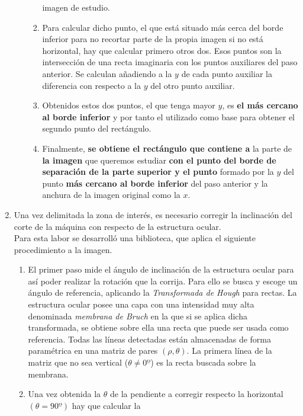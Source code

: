 \begin{enumerate}
\begin{enumerate}[label*=\arabic*.]
\begin{enumerate}[label*=\arabic*.]
      imagen de estudio.
    \item Para calcular dicho punto, el que está situado más cerca del
      borde inferior para no recortar parte de la propia imagen si no
      está horizontal, hay que calcular primero otros dos. Esos puntos
      son la intersección de una recta imaginaria con los puntos
      auxiliares del paso anterior. Se calculan añadiendo a la $y$ de
      cada punto auxiliar la diferencia con respecto a la $y$ del otro
      punto auxiliar.
    \item Obtenidos estos dos puntos, el que tenga mayor $y$, es
      \textbf{el más cercano al borde inferior} y por tanto el
      utilizado como base para obtener el segundo punto del
      rectángulo.
    \item Finalmente, \textbf{se obtiene el rectángulo que contiene a}
      la parte de \textbf{la imagen} que queremos estudiar \textbf{con
        el punto del borde de separación de la parte superior y el
        punto} formado por la $y$ del punto \textbf{más cercano al
        borde inferior} del paso anterior y la anchura de la imagen
      original como la $x$.
    \end{enumerate}
  \end{enumerate}
\item Una vez delimitada la zona de interés, es necesario corregir la
  inclinación del corte de la máquina con respecto de la
  estructura ocular. \\
  Para esta labor se desarrolló una biblioteca, que aplica el
  siguiente procedimiento a la imagen.
  \begin{enumerate}[label*=\arabic*.]
  \item El primer paso mide el ángulo de inclinación de la estructura
    ocular para así poder realizar la rotación que la corrija.  Para
    ello se busca y escoge un ángulo de referencia, aplicando la
    \emph{Transformada de Hough} para rectas. La estructura ocular
    posee una capa con una intensidad muy alta denominada
    \emph{membrana de Bruch} en la que si se aplica dicha
    transformada, se obtiene sobre ella una recta que puede ser usada
    como referencia. Todas las líneas detectadas están almacenadas de
    forma paramétrica en una matriz de pares
    $\left( \rho, \theta \right)$. La primera línea de la matriz que
    no sea vertical ($\theta \neq 0º$) es la recta buscada sobre la
    membrana.
  \item Una vez obtenida la $\theta$ de la pendiente a corregir respecto la
    horizontal $\left( \theta = 90º \right)$ hay que calcular la

\end{enumerate}
\end{enumerate}
